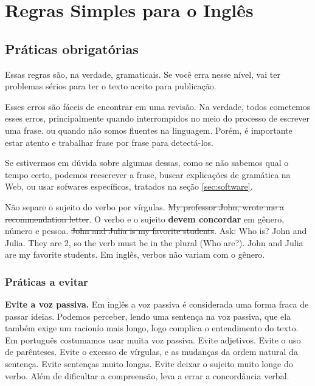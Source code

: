 \documentclass[openany]{book}
\begin{document}
\chapter{Regras Simples para o Inglês}

\section{Práticas obrigatórias}

Essas regras são, na verdade, gramaticais. Se você erra nesse nível, vai ter problemas sérios para ter o texto aceito para publicação.

Esses erros são fáceis de encontrar em uma revisão. Na verdade, todos cometemos esses erros, principalmente quando interrompidos no meio do processo de escrever uma frase. ou quando não somos fluentes na linguagem. Porém, é importante estar atento e trabalhar frase por frase para detectá-los.

Se estivermos em dúvida sobre algumas dessas, como se não sabemos qual o tempo certo, podemos reescrever a frase, buscar explicações de gramática na Web, ou usar sofwares específicos, tratados na seção \ref{sec:software}.

\begin{outline}
    \1 Não separe o sujeito do verbo por vírgulas.
    \2 \sout{My professor John, wrote me a recommendation letter}.
    \1 O verbo e o sujeito \textbf{devem concordar} em gênero, número e pessoa.
    \2 \sout{John and Julia is my favorite students}.
        \3 Ask: Who is? John and Julia. They are 2, so the verb must be in the plural (Who are?).
    \2 John and Julia are my favorite students.
    \2 Em inglês, verbos não variam com o gênero.
\end{outline}

\subsection{Práticas a evitar}
\begin{outline}
\1 \textbf{Evite a voz passiva.}
\2 Em inglês a voz passiva é considerada uma forma fraca de passar ideias. Podemos perceber, lendo uma sentença na voz passiva, que ela também exige um racionío mais longo, logo complica o entendimento do texto. Em português costumamos usar muita voz passiva.
\1 Evite adjetivos.
\1 Evite o uso de parênteses.
\1 Evite o excesso de vírgulas, e as mudanças da ordem natural da sentença.
\1 Evite sentenças muito longas.
\1 Evite deixar o sujeito muito longe do verbo.
\2 Além de dificultar a compreensão, leva a errar a concordância verbal.
\end{outline}
\end{document}
